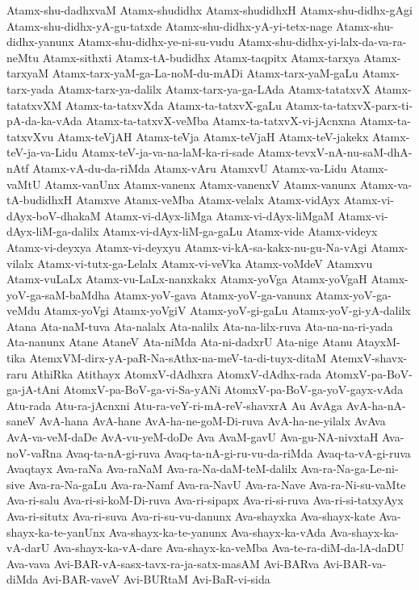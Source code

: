 {Atamx-shu-dadhxvaM
Atamx-shudidhx
Atamx-shudidhxH
Atamx-shu-didhx-gAgi
Atamx-shu-didhx-yA-gu-tatxde
Atamx-shu-didhx-yA-yi-tetx-nage
Atamx-shu-didhx-yanunx
Atamx-shu-didhx-ye-ni-su-vudu
Atamx-shu-didhx-yi-lalx-da-va-ra-neMtu
Atamx-sithxti
Atamx-tA-budidhx
Atamx-taqpitx
Atamx-tarxya
Atamx-tarxyaM
Atamx-tarx-yaM-ga-La-noM-du-mADi
Atamx-tarx-yaM-gaLu
Atamx-tarx-yada
Atamx-tarx-ya-dalilx
Atamx-tarx-ya-ga-LAda
Atamx-tatatxvX
Atamx-tatatxvXM
Atamx-ta-tatxvXda
Atamx-ta-tatxvX-gaLu
Atamx-ta-tatxvX-parx-ti-pA-da-ka-vAda
Atamx-ta-tatxvX-veMba
Atamx-ta-tatxvX-vi-jAcnxna
Atamx-ta-tatxvXvu
Atamx-teVjAH
Atamx-teVja
Atamx-teVjaH
Atamx-teV-jakekx
Atamx-teV-ja-va-Lidu
Atamx-teV-ja-va-na-laM-ka-ri-sade
Atamx-tevxV-nA-nu-saM-dhA-nAtf
Atamx-vA-du-da-riMda
Atamx-vAru
AtamxvU
Atamx-va-Lidu
Atamx-vaMtU
Atamx-vanUnx
Atamx-vanenx
Atamx-vanenxV
Atamx-vanunx
Atamx-va-tA-budidhxH
Atamxve
Atamx-veMba
Atamx-velalx
Atamx-vidAyx
Atamx-vi-dAyx-boV-dhakaM
Atamx-vi-dAyx-liMga
Atamx-vi-dAyx-liMgaM
Atamx-vi-dAyx-liM-ga-dalilx
Atamx-vi-dAyx-liM-ga-gaLu
Atamx-vide
Atamx-videyx
Atamx-vi-deyxya
Atamx-vi-deyxyu
Atamx-vi-kA-sa-kakx-nu-gu-Na-vAgi
Atamx-vilalx
Atamx-vi-tutx-ga-Lelalx
Atamx-vi-veVka
Atamx-voMdeV
Atamxvu
Atamx-vuLaLx
Atamx-vu-LaLx-nanxkakx
Atamx-yoVga
Atamx-yoVgaH
Atamx-yoV-ga-saM-baMdha
Atamx-yoV-gava
Atamx-yoV-ga-vanunx
Atamx-yoV-ga-veMdu
Atamx-yoVgi
Atamx-yoVgiV
Atamx-yoV-gi-gaLu
Atamx-yoV-gi-yA-dalilx
Atana
Ata-naM-tuva
Ata-nalalx
Ata-nalilx
Ata-na-lilx-ruva
Ata-na-na-ri-yada
Ata-nanunx
Atane
AtaneV
Ata-niMda
Ata-ni-dadxrU
Ata-nige
Atanu
AtayxM-tika
AtemxVM-dirx-yA-paR-Na-sAthx-na-meV-ta-di-tuyx-ditaM
AtemxV-shavx-raru
AthiRka
Atithayx
AtomxV-dAdhxra
AtomxV-dAdhx-rada
AtomxV-pa-BoV-ga-jA-tAni
AtomxV-pa-BoV-ga-vi-Sa-yANi
AtomxV-pa-BoV-ga-yoV-gayx-vAda
Atu-rada
Atu-ra-jAcnxni
Atu-ra-veY-ri-mA-reV-shavxrA
Au
AvAga
AvA-ha-nA-saneV
AvA-hana
AvA-hane
AvA-ha-ne-goM-Di-ruva
AvA-ha-ne-yilalx
AvAva
AvA-va-veM-daDe
AvA-vu-yeM-doDe
Ava
AvaM-gavU
Ava-gu-NA-nivxtaH
Ava-noV-vaRna
Avaq-ta-nA-gi-ruva
Avaq-ta-nA-gi-ru-vu-da-riMda
Avaq-ta-vA-gi-ruva
Avaqtayx
Ava-raNa
Ava-raNaM
Ava-ra-Na-daM-teM-dalilx
Ava-ra-Na-ga-Le-ni-sive
Ava-ra-Na-gaLu
Ava-ra-Namf
Ava-ra-NavU
Ava-ra-Nave
Ava-ra-Ni-su-vaMte
Ava-ri-salu
Ava-ri-si-koM-Di-ruva
Ava-ri-sipapx
Ava-ri-si-ruva
Ava-ri-si-tatxyAyx
Ava-ri-situtx
Ava-ri-suva
Ava-ri-su-vu-danunx
Ava-shayxka
Ava-shayx-kate
Ava-shayx-ka-te-yanUnx
Ava-shayx-ka-te-yanunx
Ava-shayx-ka-vAda
Ava-shayx-ka-vA-darU
Ava-shayx-ka-vA-dare
Ava-shayx-ka-veMba
Ava-te-ra-diM-da-lA-daDU
Ava-vava
Avi-BAR-vA-sasx-tavx-ra-ja-satx-masAM
Avi-BARva
Avi-BAR-va-diMda
Avi-BAR-vaveV
Avi-BURtaM
Avi-BaR-vi-sida
}
